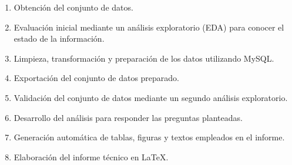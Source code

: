 \begin{enumerate}

\item Obtención del conjunto de datos.

\item Evaluación inicial mediante un análisis exploratorio (EDA) para conocer el estado de la información.

\item Limpieza, transformación y preparación de los datos utilizando MySQL.

\item Exportación del conjunto de datos preparado.

\item Validación del conjunto de datos mediante un segundo análisis exploratorio.

\item Desarrollo del análisis para responder las preguntas planteadas.

\item Generación automática de tablas, figuras y textos empleados en el informe.

\item Elaboración del informe técnico en \LaTeX.

\end{enumerate}